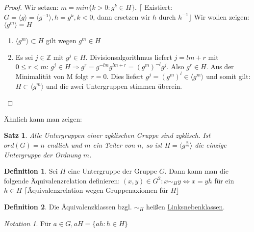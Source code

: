 \documentclass[12pt]{scrartcl}%
\newtheorem{thm}{Satz}
\theoremstyle{definition}
\newtheorem*{defn}{Definition}
\theoremstyle{remark}
\newtheorem*{notation}{Notation}
\begin{document}
\begin{proof}
	Wir setzen: $m = min \lbrace k>0 : g^{k} \in H \rbrace$. \newline $\lceil$ Existiert: $G= \langle g \rangle = \langle g^{-1} \rangle, h = g^{k}, k<0$, dann ersetzen wir $h$ durch $h^{-1} \rfloor$ \newline Wir wollen zeigen: $\langle g^{m} \rangle = H$ 
	\begin{enumerate}
		\item $\langle g^{m} \rangle \subset H$ gilt wegen $g^{m} \in H$
		\item Es sei $j \in  \mathbb{Z}$ mit $g^{j} \in H$. Divisionsalgorithmus liefert $j=lm+r$ mit $0 \leq r < m$: $g^{j} \in H \Rightarrow g^{r}=g^{-lm}g^{lm+r}=(g^{m})^{-l}g^{j}$. Also $g^{r} \in H$. Aus der Minimalität von M folgt $r=0$. Dies liefert $g^{j}=(g^{m})^{l} \in \langle g^{m} \rangle$ und somit gilt: $H \subset \langle g^{m} \rangle$ und die zwei Untergruppen stimmen überein.
	\end{enumerate}
\end{proof}

Ähnlich kann man zeigen:

\begin{thm}
	Alle Untergruppen einer zyklischen Gruppe sind zyklisch. Ist $ord(G)=n$ endlich und $m$ ein Teiler von $n$, so ist $H = \langle g^{\frac{n}{m}}\rangle$ die einzige Untergruppe der Ordnung $m$. %
\end{thm}

\begin{defn}
	Sei $H$ eine Untergruppe der Gruppe $G$. Dann kann man die folgende Äquivalenzrelation definieren: \newline $(x,y) \in G^{2}: x \sim_{H} y \Leftrightarrow x = yh$ für ein $h \in H$ \newline $\lceil$Äquivalenzrelation wegen Gruppenaxiomen für $H\rfloor$
\end{defn}

\begin{defn}
	Die Äquivalenzklassen bzgl. $\sim_{H}$ heißen \underline{Linksnebenklassen}.
\end{defn}

\begin{notation}
	Für $a \in G, aH = \{ah : h \in H\}$
\end{notation}
\end{document}
